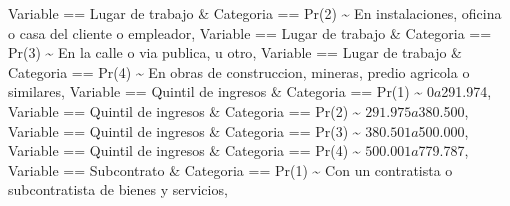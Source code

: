\documentclass[
]{article}
\newenvironment{Shaded}{\begin{snugshade}}{\end{snugshade}}
\newcommand{\NormalTok}[1]{#1}
\newcommand{\SpecialCharTok}[1]{\textcolor[rgb]{0.00,0.00,0.00}{#1}}
\newcommand{\StringTok}[1]{\textcolor[rgb]{0.31,0.60,0.02}{#1}}
\begin{document}
\begin{Shaded}
\begin{Highlighting}[]
\NormalTok{         Variable }\SpecialCharTok{==} \StringTok{\textquotesingle{}Lugar de trabajo\textquotesingle{}} \SpecialCharTok{\&}\NormalTok{ Categoria }\SpecialCharTok{==} \StringTok{\textquotesingle{}Pr(2)\textquotesingle{}} \SpecialCharTok{\textasciitilde{}} \StringTok{\textquotesingle{}En instalaciones, oficina o casa del cliente o empleador\textquotesingle{}}\NormalTok{,}
\NormalTok{         Variable }\SpecialCharTok{==} \StringTok{\textquotesingle{}Lugar de trabajo\textquotesingle{}} \SpecialCharTok{\&}\NormalTok{ Categoria }\SpecialCharTok{==} \StringTok{\textquotesingle{}Pr(3)\textquotesingle{}} \SpecialCharTok{\textasciitilde{}} \StringTok{\textquotesingle{}En la calle o via publica, u otro\textquotesingle{}}\NormalTok{,}
\NormalTok{         Variable }\SpecialCharTok{==} \StringTok{\textquotesingle{}Lugar de trabajo\textquotesingle{}} \SpecialCharTok{\&}\NormalTok{ Categoria }\SpecialCharTok{==} \StringTok{\textquotesingle{}Pr(4)\textquotesingle{}} \SpecialCharTok{\textasciitilde{}} \StringTok{\textquotesingle{}En obras de construccion, mineras, predio agricola o similares\textquotesingle{}}\NormalTok{,}
\NormalTok{         Variable }\SpecialCharTok{==} \StringTok{\textquotesingle{}Quintil de ingresos\textquotesingle{}} \SpecialCharTok{\&}\NormalTok{ Categoria }\SpecialCharTok{==} \StringTok{\textquotesingle{}Pr(1)\textquotesingle{}} \SpecialCharTok{\textasciitilde{}} \StringTok{\textquotesingle{}$0 a $291.974\textquotesingle{}}\NormalTok{,}
\NormalTok{         Variable }\SpecialCharTok{==} \StringTok{\textquotesingle{}Quintil de ingresos\textquotesingle{}} \SpecialCharTok{\&}\NormalTok{ Categoria }\SpecialCharTok{==} \StringTok{\textquotesingle{}Pr(2)\textquotesingle{}} \SpecialCharTok{\textasciitilde{}} \StringTok{\textquotesingle{}$291.975 a $380.500\textquotesingle{}}\NormalTok{,}
\NormalTok{         Variable }\SpecialCharTok{==} \StringTok{\textquotesingle{}Quintil de ingresos\textquotesingle{}} \SpecialCharTok{\&}\NormalTok{ Categoria }\SpecialCharTok{==} \StringTok{\textquotesingle{}Pr(3)\textquotesingle{}} \SpecialCharTok{\textasciitilde{}} \StringTok{\textquotesingle{}$380.501 a $500.000\textquotesingle{}}\NormalTok{,}
\NormalTok{         Variable }\SpecialCharTok{==} \StringTok{\textquotesingle{}Quintil de ingresos\textquotesingle{}} \SpecialCharTok{\&}\NormalTok{ Categoria }\SpecialCharTok{==} \StringTok{\textquotesingle{}Pr(4)\textquotesingle{}} \SpecialCharTok{\textasciitilde{}} \StringTok{\textquotesingle{}$500.001 a $779.787\textquotesingle{}}\NormalTok{,}
\NormalTok{         Variable }\SpecialCharTok{==} \StringTok{\textquotesingle{}Subcontrato\textquotesingle{}} \SpecialCharTok{\&}\NormalTok{ Categoria }\SpecialCharTok{==} \StringTok{\textquotesingle{}Pr(1)\textquotesingle{}} \SpecialCharTok{\textasciitilde{}} \StringTok{\textquotesingle{}Con un contratista o subcontratista de bienes y servicios\textquotesingle{}}\NormalTok{,}

\end{Highlighting}
\end{Shaded}
\end{document}
